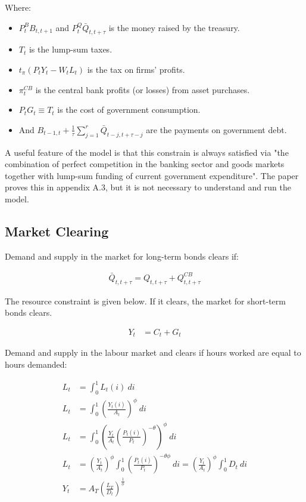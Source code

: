 \documentclass[12pt]{article}
\begin{document}
Where:

\begin{itemize}
    \item $P_{t}^{B}B_{t,t+1}$ and $P_{t}^{Q}\bar{Q}_{t,t+\tau}$ is the money raised by the treasury.
    \item $T_{t}$ is the lump-sum taxes.
    \item $t_{\pi}(P_{t}Y_{t}-W_{t}L_{t})$ is the tax on firms' profits.
    \item $\pi^{CB}_t$ is the central bank profits (or losses) from asset purchases.
    \item $P_{t}G_{t} \equiv T_{t}$ is the cost of government consumption.
    \item And $B_{t-1,t}+{\frac{1}{\tau}}\sum_{j=1}^{r}\bar{Q}_{t-j,t+\tau-j}$ are the payments on government debt.
\end{itemize}

A useful feature of the model is that this constrain is always satisfied via "the combination of perfect competition in the banking sector and goods markets together with lump-sum funding of current government expenditure". The paper proves this in appendix A.3, but it is not necessary to understand and run the model.



\subsection{Market Clearing}

Demand and supply in the market for long-term bonds clears if:

\begin{align*}
    \bar Q_{t,t+\tau} = Q_{t,t+\tau} + Q^{CB}_{t,t+\tau} \tag{23}
\end{align*}

The resource constraint is given below. If it clears, the market for short-term bonds clears.

\begin{align*}
    Y_t &= C_t + G_t \tag{24}
\end{align*}


Demand and supply in the labour market and clears if hours worked are equal to hours demanded:

\begin{align*}
    L_t &= \int^1_0 L_t(i) ~di\\
    L_t &= \int^1_0 \left(\frac{Y_t(i)}{A_t}\right)^\phi ~di\\
    L_t &= \int^1_0 \left(\frac{Y_t}{A_t}\left(\frac{P_t(i)}{P_t}\right)^{-\theta}\right)^\phi ~di\\
    L_t &= \left(\frac{Y_t}{A_t}\right)^\phi\int^1_0 \left(\frac{P_t(i)}{P_t}\right)^{-\theta\phi} ~di = \left(\frac{Y_t}{A_t}\right)^\phi\int^1_0 D_t ~di\\
    Y_t &= A_T \left(\frac{L_T}{D_t}\right)^\frac{1}{\phi} \tag{25}
\end{align*}
\end{document}

